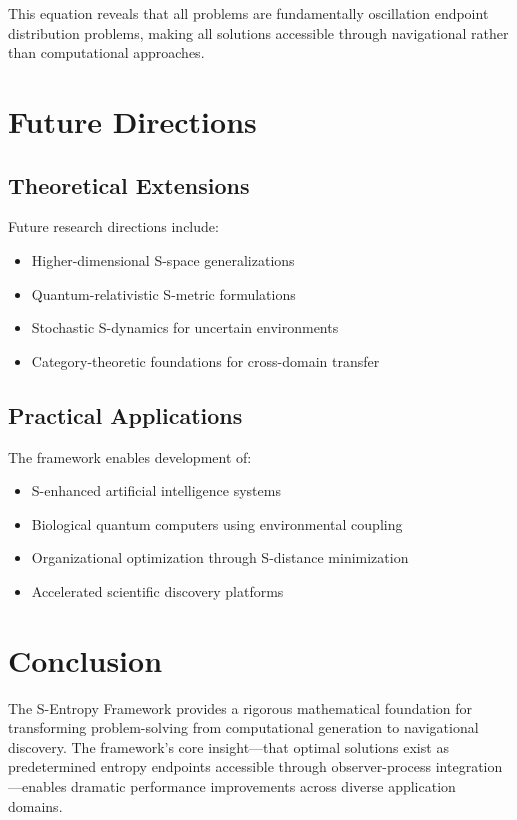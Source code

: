 \documentclass[12pt,a4paper]{article}
\begin{document}
This equation reveals that all problems are fundamentally oscillation endpoint distribution problems, making all solutions accessible through navigational rather than computational approaches.

\section{Future Directions}

\subsection{Theoretical Extensions}

Future research directions include:
\begin{itemize}
\item Higher-dimensional S-space generalizations
\item Quantum-relativistic S-metric formulations
\item Stochastic S-dynamics for uncertain environments
\item Category-theoretic foundations for cross-domain transfer
\end{itemize}

\subsection{Practical Applications}

The framework enables development of:
\begin{itemize}
\item S-enhanced artificial intelligence systems
\item Biological quantum computers using environmental coupling
\item Organizational optimization through S-distance minimization
\item Accelerated scientific discovery platforms
\end{itemize}

\section{Conclusion}

The S-Entropy Framework provides a rigorous mathematical foundation for transforming problem-solving from computational generation to navigational discovery. The framework's core insight—that optimal solutions exist as predetermined entropy endpoints accessible through observer-process integration—enables dramatic performance improvements across diverse application domains.
\end{document}
